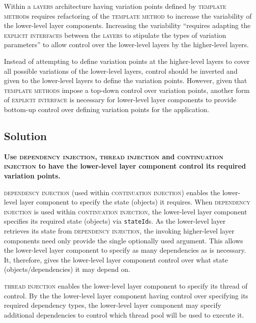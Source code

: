 \documentclass[prodmode]{style/acmlarge}
\begin{document}
Within a \textsc{layers} architecture having variation points defined by
\textsc{template method}s requires refactoring of the \textsc{template method}
to increase the variability of the lower-level layer components.  Increasing the
variability ``requires adapting the \textsc{explicit interfaces} between the
\textsc{layers} to stipulate the types of variation parameters'' \cite[p.
5]{ioc} to allow control over the lower-level layers by the higher-level layers.

Instead of attempting to define variation points at the higher-level layers to cover
all possible variations of the lower-level layers, control should be inverted and
given to the lower-level layers to define the variation points.  However, given
that \textsc{template methods} impose a top-down control over variation points,
another form of \textsc{explicit interface} is necessary for lower-level layer
components to provide bottom-up control over defining variation points for the
application.


\subsection{Solution}

\textbf{Use \textsc{dependency injection}, \textsc{thread injection} and \textsc{continuation injection} to have the lower-level layer component control its required variation points.}

\textsc{dependency injection} \cite{ioc} (used within \textsc{continuation
injection}) enables the lower-level layer component to specify the state
(objects) it requires.  When \textsc{dependency injection} is used within
\textsc{continuation injection}, the lower-level layer component specifies its
required state (objects) via \texttt{stateId}s.  As the lower-level layer
retrieves its state from \textsc{dependency injection}, the invoking
higher-level layer components need only provide the single optionally used
argument.  This allows the lower-level layer component to specify as many
dependencies as is necessary.  It, therefore, gives the lower-level layer component
control over what state (objects/dependencies) it may depend on.

\textsc{thread injection} enables the lower-level layer component to specify its
thread of control.  By the the lower-level layer component having control over
specifying its required dependency types, the lower-level layer component may
specify additional dependencies to control which thread pool will be used to
execute it.
\end{document}
